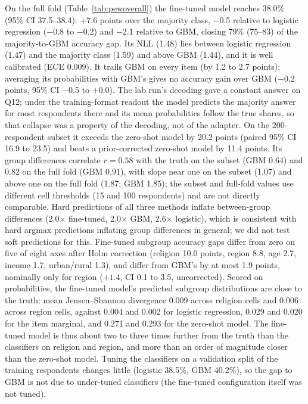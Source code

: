 \documentclass[conference]{IEEEtran}
\begin{document}
On the full fold (Table~\ref{tab:pewoverall}) the fine-tuned model reaches 38.0\% (95\% CI 37.5--38.4): +7.6 points over the majority class, $-$0.5 relative to logistic regression ($-$0.8 to $-$0.2) and $-$2.1 relative to GBM, closing 79\% (75--83) of the majority-to-GBM accuracy gap. Its NLL (1.48) lies between logistic regression (1.47) and the majority class (1.59) and above GBM (1.44), and it is well calibrated (ECE 0.009). It trails GBM on every item (by 1.2 to 2.7 points); averaging its probabilities with GBM's gives no accuracy gain over GBM ($-$0.2 points, 95\% CI $-$0.5 to $+$0.0). The lab run's decoding gave a constant answer on Q12; under the training-format readout the model predicts the majority answer for most respondents there and its mean probabilities follow the true shares, so that collapse was a property of the decoding, not of the adapter. On the 200-respondent subset it exceeds the zero-shot model by 20.2 points (paired 95\% CI 16.9 to 23.5) and beats a prior-corrected zero-shot model by 11.4 points. Its group differences correlate $r={0.58}$ with the truth on the subset (GBM 0.64) and 0.82 on the full fold (GBM 0.91), with slope near one on the subset (1.07) and above one on the full fold (1.87; GBM 1.85); the subset and full-fold values use different cell thresholds (15 and 100 respondents) and are not directly comparable. Hard predictions of all three methods inflate between-group differences (2.0$\times$ fine-tuned, 2.0$\times$ GBM, 2.6$\times$ logistic), which is consistent with hard argmax predictions inflating group differences in general; we did not test soft predictions for this. Fine-tuned subgroup accuracy gaps differ from zero on five of eight axes after Holm correction (religion 10.0 points, region 8.8, age 2.7, income 1.7, urban/rural 1.3), and differ from GBM's by at most 1.9 points, nominally only for region ($+1.4$, CI 0.1 to 3.5, uncorrected). Scored on probabilities, the fine-tuned model's predicted subgroup distributions are close to the truth: mean Jensen--Shannon divergence 0.009 across religion cells and 0.006 across region cells, against 0.004 and 0.002 for logistic regression, 0.029 and 0.020 for the item marginal, and 0.271 and 0.293 for the zero-shot model. The fine-tuned model is thus about two to three times further from the truth than the classifiers on religion and region, and more than an order of magnitude closer than the zero-shot model. Tuning the classifiers on a validation split of the training respondents changes little (logistic 38.5\%, GBM 40.2\%), so the gap to GBM is not due to under-tuned classifiers (the fine-tuned configuration itself was not tuned).
\end{document}
